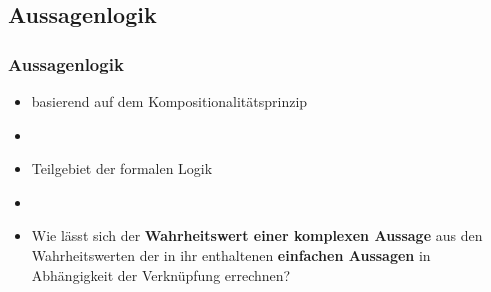 %
\subsection{Aussagenlogik}
\begin{frame}
\frametitle{Aussagenlogik}

\begin{itemize}
	\item basierend auf dem Kompositionalitätsprinzip
	\item[]
	\item Teilgebiet der formalen Logik
	\item[]
	\item Wie lässt sich der \textbf{Wahrheitswert einer komplexen Aussage} aus den Wahrheitswerten der in ihr enthaltenen \textbf{einfachen Aussagen} in Abhängigkeit der Verknüpfung errechnen?
\end{itemize}

\end{frame}


